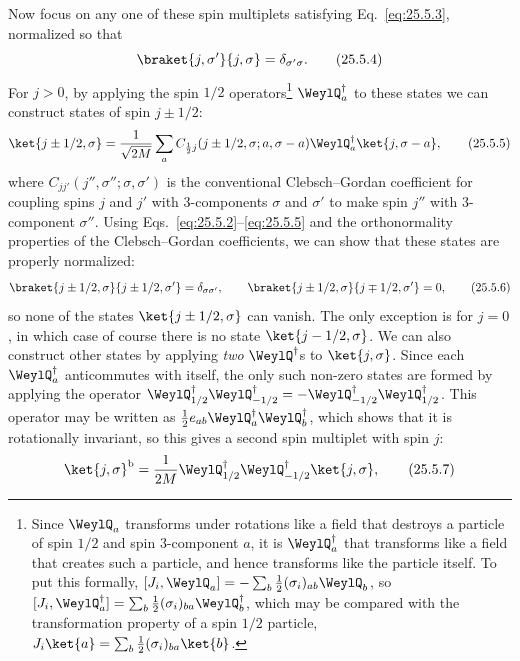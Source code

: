 Now focus on any one of these spin multiplets satisfying
Eq.~\eqref{eq:25.5.3}, normalized so that
\begin{equation}
 \braket{j,\sigma'}{j,\sigma}=\delta_{\sigma'\sigma}.
\tag{25.5.4}\label{eq:25.5.4}
\end{equation}
For $j>0$, by applying the spin $1/2$ operators\footnote{Since $\WeylQ_a$
transforms under rotations like a field that destroys a particle of spin
$1/2$ and spin 3-component $a$, it is $\WeylQ_a^\dagger$ that transforms
like a field that creates such a particle, and hence transforms like the
particle itself. To put this formally,
$[J_i,\WeylQ_a]=-\sum_b\frac12(\sigma_i)_{ab}\WeylQ_b$, so
$[J_i,\WeylQ_a^\dagger]
=\sum_b\frac12(\sigma_i)_{ba}\WeylQ_b^\dagger$, which may be compared with
the transformation property of a spin $1/2$ particle,
$J_i\ket{a}=\sum_b\frac12(\sigma_i)_{ba}\ket{b}$.}
$\WeylQ_a^\dagger$ to these states we can construct states of spin
$j\pm1/2$:
\begin{equation}
 \ket{j\pm1/2,\sigma}
 =\frac{1}{\sqrt{2M}}\sum_a
 C_{\frac12 j}(j\pm1/2,\sigma;a,\sigma-a)
 \WeylQ_a^\dagger\ket{j,\sigma-a},
\tag{25.5.5}\label{eq:25.5.5}
\end{equation}
where $C_{jj'}(j'',\sigma'';\sigma,\sigma')$ is the conventional
Clebsch--Gordan coefficient for coupling spins $j$ and $j'$ with 3-components
$\sigma$ and $\sigma'$ to make spin $j''$ with 3-component $\sigma''$. Using
Eqs.~\eqref{eq:25.5.2}--\eqref{eq:25.5.5} and the orthonormality properties
of the Clebsch--Gordan coefficients, we can show that these states are
properly normalized:
\begin{equation}
 \braket{j\pm1/2,\sigma}{j\pm1/2,\sigma'}
 =\delta_{\sigma\sigma'},
 \qquad
 \braket{j\pm1/2,\sigma}{j\mp1/2,\sigma'}=0,
\tag{25.5.6}\label{eq:25.5.6}
\end{equation}
so none of the states $\ket{j\pm1/2,\sigma}$ can vanish. The only exception
is for $j=0$, in which case of course there is no state
$\ket{j-1/2,\sigma}$. We can also construct other states by applying
\emph{two} $\WeylQ^\dagger$s to $\ket{j,\sigma}$. Since each
$\WeylQ_a^\dagger$ anticommutes with itself, the only such non-zero states
are formed by applying the operator
$\WeylQ_{1/2}^\dagger\WeylQ_{-1/2}^\dagger
=-\WeylQ_{-1/2}^\dagger\WeylQ_{1/2}^\dagger$. This operator may be written
as $\frac12 e_{ab}\WeylQ_a^\dagger\WeylQ_b^\dagger$, which shows that it is
rotationally invariant, so this gives a second spin multiplet with spin $j$:
\begin{equation}
 \ket{j,\sigma}^{\mathrm b}
 =\frac{1}{2M}\WeylQ_{1/2}^\dagger
 \WeylQ_{-1/2}^\dagger\ket{j,\sigma},
\tag{25.5.7}\label{eq:25.5.7}
\end{equation}
